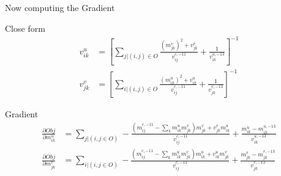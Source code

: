 \documentclass[letterpaper]{article}
\begin{document}
Now computing the Gradient

Close form
\begin{align}
    v_{ik}^u &= [\sum_{j|(i,j)\in O}\frac{(m_{jk}^v)^2 + v_{jk}^v}{v_{ij}^{c,-11}}+ \frac{1}{v_{ik}^{u,-13}}]^{-1}\\
    v_{jk}^v &= [\sum_{i|(i,j)\in O}\frac{(m_{ik}^u)^2 + v_{ik}^u}{v_{ij}^{c,-11}}+ \frac{1}{v_{jk}^{v,-13}}]^{-1}
\end{align}

Gradient
\begin{align}
    \frac{ \partial Obj}{\partial m_{ik}^u} &
    = \sum_{j|(i,j\in O)} -\frac{(m_{ij}^{c,-11} - \sum_k m_{ik}^u m_{jk}^v)m_{jk}^v + v_{jk}^{v}m_{ik}^u}{v_{ij}^{c,-11} } + \frac{m_{ik}^u - m_{ik}^{u,-13}}{v_{ik}^{u,-13}}\\
    \frac{ \partial Obj}{\partial m_{jk}^v} &
    = \sum_{i|(i,j\in O)} -\frac{(m_{ij}^{c,-11} - \sum_k m_{ik}^u m_{jk}^v)m_{ik}^u + v_{ik}^{u}m_{jk}^v}{v_{ij}^{c,-11} } + \frac{m_{jk}^v - m_{jk}^{v,-13}}{v_{jk}^{v,-13}}
\end{align}
\end{document}
